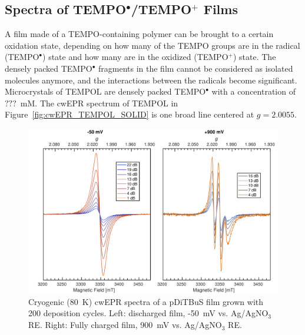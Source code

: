 \subsection{Spectra of TEMPO$^{\bullet}$/TEMPO$^{+}$ Films}
A film made of a TEMPO-containing polymer can be brought to a certain oxidation state, depending on how many of the TEMPO groups are in the radical (TEMPO$^{\bullet}$) state and how many are in the oxidized (TEMPO$^{+}$) state. The densely packed TEMPO$^{\bullet}$ fragments in the film cannot be considered as isolated molecules anymore, and the interactions between the radicals become significant. Microcrystals of TEMPOL are densely packed TEMPO$^{\bullet}$ with a concentration of $???$~mM. The cwEPR spectrum of TEMPOL in Figure~\ref{fig:cwEPR_TEMPOL_SOLID} is one broad line centered at $g=2.0055$.

\begin{figure}[h]
\center
	\includegraphics[width=1\textwidth]{./operando_epr/figures/CRYO/S220104_CW.pdf}
	\caption{Cryogenic (80~K) cwEPR spectra of a pDiTBuS film grown with 200 deposition cycles. Left: discharged film, -50~mV vs. Ag/AgNO$_3$ RE. Right: Fully charged film, 900~mV vs. Ag/AgNO$_3$ RE.}
	\label{fig:cwEPR_CRYO_DiTBuS_DCG_vs_CHG}
\end{figure}

